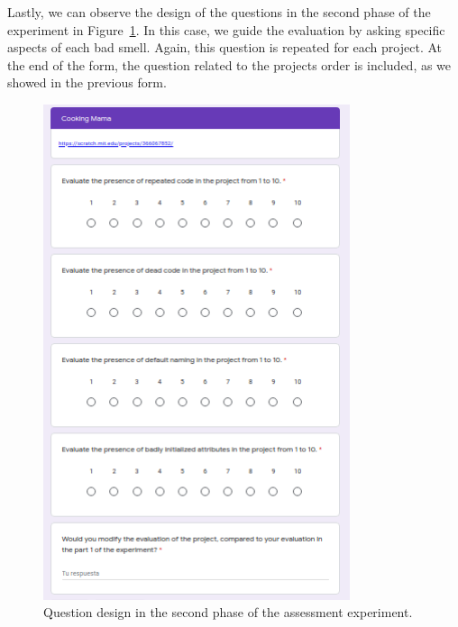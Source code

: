 Lastly, we can observe the design of the questions in the second phase of the experiment in Figure~\ref{fig:question_design_2}. In this case, we guide the evaluation by asking specific aspects of each bad smell. Again, this question is repeated for each project. At the end of the form, the question related to the projects order is included, as we showed in the previous form.

\begin{figure}
    \centering
    \includegraphics[width=9cm,                         keepaspectratio]{img/experiment_question_2.png}
    \caption{Question design in the second phase of the assessment experiment.}
    \label{fig:question_design_2}
\end{figure}

